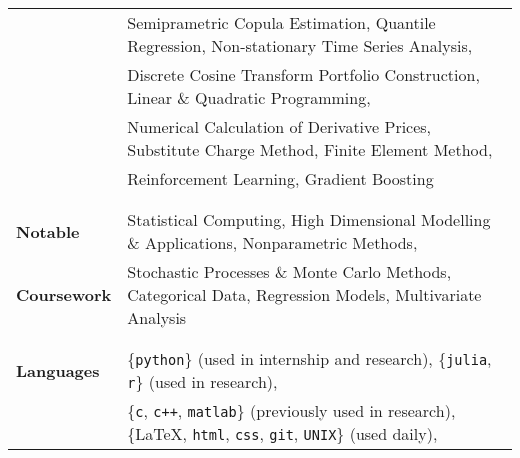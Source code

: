 \documentclass[utf8,letterpaper,oneside]{article}
\begin{document}
\begin{center}
\begin{tabular}{l l}
                           & Semiprametric Copula Estimation, Quantile Regression, Non-stationary Time Series Analysis,                                                       \\
                           & Discrete Cosine Transform Portfolio Construction, Linear \& Quadratic Programming,                                                               \\
                           & Numerical Calculation of Derivative Prices, Substitute Charge Method, Finite Element Method,                                                     \\
                           & {Reinforcement Learning}, {Gradient Boosting}                                                                                                    \\
                           &                                                                                                                                                  \\ \hline
                           &                                                                                                                                                  \\
  \textbf{Notable}         & Statistical Computing, {High Dimensional} Modelling \& Applications, {Nonparametric} Methods,                                                    \\
  \textbf{Coursework}      & Stochastic Processes \& Monte Carlo Methods, Categorical Data, Regression Models, Multivariate Analysis                                          \\
                           &                                                                                                                                                  \\ \hline
                           &                                                                                                                                                  \\
  \textbf{Languages}       & \{{\texttt{python}}\} (used in internship and research), \{{\texttt{julia}, \texttt{r}}\} (used in research),                                    \\ &\{{\texttt{c}, \texttt{c++}}, \texttt{matlab}\} (previously used in research), \{\LaTeX, \texttt{html}, \texttt{css}, {\texttt{git}}, \texttt{UNIX}\} (used daily),                  \\

\end{tabular}
\end{center}
\end{document}
